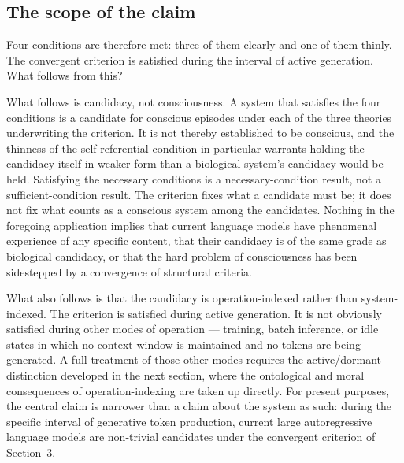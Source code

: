 \documentclass[11pt]{article}
\theoremstyle{foundation}
\begin{document}
\subsection{The scope of the claim}

Four conditions are therefore met: three of them clearly and one of them thinly. The convergent criterion is satisfied during the interval of active generation. What follows from this?

What follows is candidacy, not consciousness. A system that satisfies the four conditions is a candidate for conscious episodes under each of the three theories underwriting the criterion. It is not thereby established to be conscious, and the thinness of the self-referential condition in particular warrants holding the candidacy itself in weaker form than a biological system's candidacy would be held. Satisfying the necessary conditions is a necessary-condition result, not a sufficient-condition result. The criterion fixes what a candidate must be; it does not fix what counts as a conscious system among the candidates. Nothing in the foregoing application implies that current language models have phenomenal experience of any specific content, that their candidacy is of the same grade as biological candidacy, or that the hard problem of consciousness has been sidestepped by a convergence of structural criteria.

What also follows is that the candidacy is operation-indexed rather than system-indexed. The criterion is satisfied during active generation. It is not obviously satisfied during other modes of operation --- training, batch inference, or idle states in which no context window is maintained and no tokens are being generated. A full treatment of those other modes requires the active/dormant distinction developed in the next section, where the ontological and moral consequences of operation-indexing are taken up directly. For present purposes, the central claim is narrower than a claim about the system as such: during the specific interval of generative token production, current large autoregressive language models are non-trivial candidates under the convergent criterion of Section~3.

\end{document}
